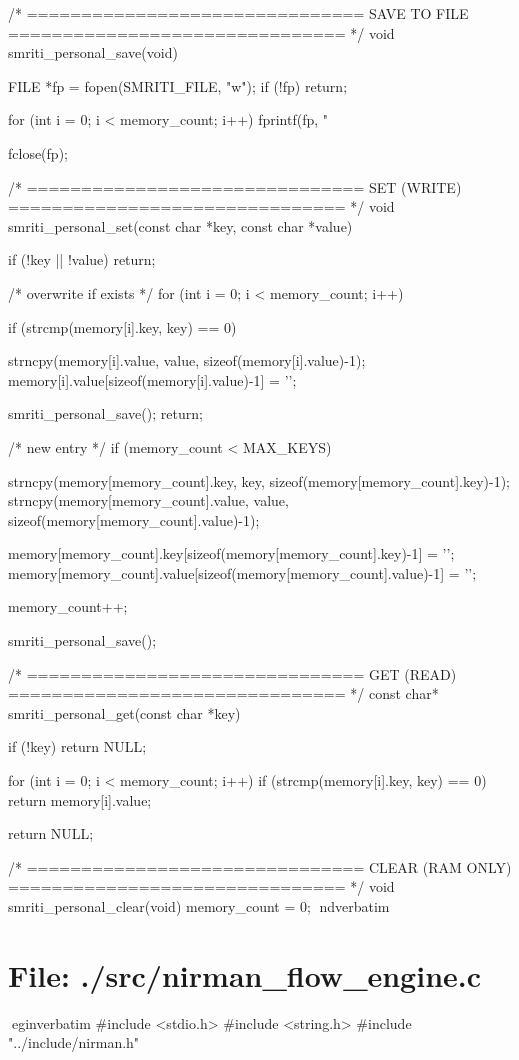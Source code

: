 \documentclass{article}
\begin{document}
/* ===============================
   SAVE TO FILE
   =============================== */
void smriti_personal_save(void)
{
    FILE *fp = fopen(SMRITI_FILE, "w");
    if (!fp) return;

    for (int i = 0; i < memory_count; i++)
    {
        fprintf(fp, "%
    }

    fclose(fp);
}

/* ===============================
   SET (WRITE)
   =============================== */
void smriti_personal_set(const char *key, const char *value)
{
    if (!key || !value) return;

    /* overwrite if exists */
    for (int i = 0; i < memory_count; i++)
    {
        if (strcmp(memory[i].key, key) == 0)
        {
            strncpy(memory[i].value, value, sizeof(memory[i].value)-1);
            memory[i].value[sizeof(memory[i].value)-1] = '\0';

            smriti_personal_save();
            return;
        }
    }

    /* new entry */
    if (memory_count < MAX_KEYS)
    {
        strncpy(memory[memory_count].key, key, sizeof(memory[memory_count].key)-1);
        strncpy(memory[memory_count].value, value, sizeof(memory[memory_count].value)-1);

        memory[memory_count].key[sizeof(memory[memory_count].key)-1] = '\0';
        memory[memory_count].value[sizeof(memory[memory_count].value)-1] = '\0';

        memory_count++;

        smriti_personal_save();
    }
}

/* ===============================
   GET (READ)
   =============================== */
const char* smriti_personal_get(const char *key)
{
    if (!key) return NULL;

    for (int i = 0; i < memory_count; i++)
    {
        if (strcmp(memory[i].key, key) == 0)
        {
            return memory[i].value;
        }
    }

    return NULL;
}

/* ===============================
   CLEAR (RAM ONLY)
   =============================== */
void smriti_personal_clear(void)
{
    memory_count = 0;
}
nd{verbatim}
\section*{File: ./src/nirman_flow_engine.c}
egin{verbatim}
#include <stdio.h>
#include <string.h>
#include "../include/nirman.h"
\end{document}
